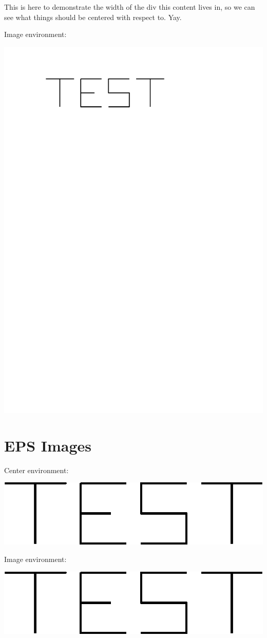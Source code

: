 \documentclass{ximera}
\begin{document}
\begin{problem}
This is here to demonstrate the width of the div this content lives in, so we can see what things should be centered with respect to. Yay.
\end{problem}

Image environment:

\begin{image}
\includegraphics{TestImagePDF}
\end{image}



\section{EPS Images}

Center environment:

\begin{center}
\includegraphics{TestImageEPS}
\end{center}

Image environment:

\begin{image}
\includegraphics{TestImageEPS}
\end{image}
\end{document}
